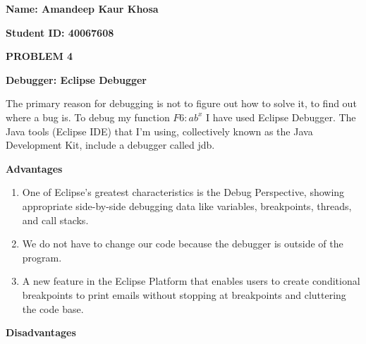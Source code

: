 \documentclass[12pt]{article}
\begin{document}
\setlength{\parskip}{0.0pt}
\textbf{Name: Amandeep Kaur Khosa}\par

\textbf{Student ID: 40067608}\par


\vspace{\baselineskip}
\begin{Center}
{\fontsize{14pt}{16.8pt}\selectfont \textbf{PROBLEM 4}\par}
\end{Center}\par


\vspace{\baselineskip}
{\fontsize{14pt}{16.8pt}\selectfont \textbf{Debugger: Eclipse Debugger}\par}\par


\vspace{\baselineskip}
The primary reason for debugging is not to figure out how to solve it, to find out where a bug is. To debug my function   \( F6:ab^{x} \)  I have used Eclipse Debugger. The Java tools (Eclipse IDE) that I'm using, collectively known as the Java Development Kit, include a debugger called jdb. \par


\vspace{\baselineskip}
\textbf{Advantages}\par

\begin{enumerate}
	\item One of Eclipse's greatest characteristics is the Debug Perspective, showing appropriate side-by-side debugging data like variables, breakpoints, threads, and call stacks.\par

	\item We do not have to change our code because the debugger is outside of the program.\par

	\item A new feature in the Eclipse Platform that enables users to create conditional breakpoints to print emails without stopping at breakpoints and cluttering the code base.
\end{enumerate}\par


\vspace{\baselineskip}
\textbf{Disadvantages }\par
\end{document}
